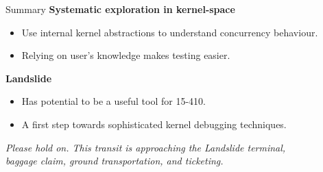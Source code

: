 \documentclass[xcolor=dvipsnames]{beamer}
\begin{document}
\begin{frame}{Summary}
	\textbf{Systematic exploration in kernel-space}
	\begin{itemize}
		\item Use internal kernel abstractions to understand concurrency behaviour.
		\item Relying on user's knowledge makes testing easier.
	\end{itemize}
	\linegap
	\textbf{Landslide}
	\begin{itemize}
		\item Has potential to be a useful tool for 15-410.
		\item A first step towards sophisticated kernel debugging techniques.
	\end{itemize}

	\linegap
	\linegap
	\begin{center}
	{\scriptsize \em Please hold on. This transit is approaching the Landslide terminal, \\baggage claim, ground transportation, and ticketing.}
	\end{center}
\end{frame}

\end{document}
